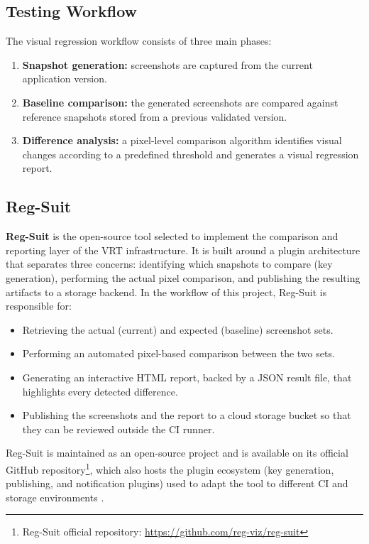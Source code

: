 \subsection{Testing Workflow}

The visual regression workflow consists of three main phases:

\begin{enumerate}
    \item \textbf{Snapshot generation:} screenshots are captured from the current application version.
    
    \item \textbf{Baseline comparison:} the generated screenshots are compared against reference snapshots stored from a previous validated version.
    
    \item \textbf{Difference analysis:} a pixel-level comparison algorithm identifies visual changes according to a predefined threshold and generates a visual regression report.
\end{enumerate}

\subsection{Reg-Suit}

\textbf{Reg-Suit} is the open-source tool selected to implement the comparison and reporting layer of the \ac{VRT} infrastructure. It is built around a plugin architecture that separates three concerns: identifying which snapshots to compare (key generation), performing the actual pixel comparison, and publishing the resulting artifacts to a storage backend. In the workflow of this project, Reg-Suit is responsible for:

\begin{itemize}
    \item Retrieving the actual (current) and expected (baseline) screenshot sets.
    \item Performing an automated pixel-based comparison between the two sets.
    \item Generating an interactive HTML report, backed by a JSON result file, that highlights every detected difference.
    \item Publishing the screenshots and the report to a cloud storage bucket so that they can be reviewed outside the \ac{CI} runner.
\end{itemize}

Reg-Suit is maintained as an open-source project and is available on its official GitHub repository\footnote{Reg-Suit official repository: \url{https://github.com/reg-viz/reg-suit}}, which also hosts the plugin ecosystem (key generation, publishing, and notification plugins) used to adapt the tool to different \ac{CI} and storage environments \cite{regsuit_repo}.

